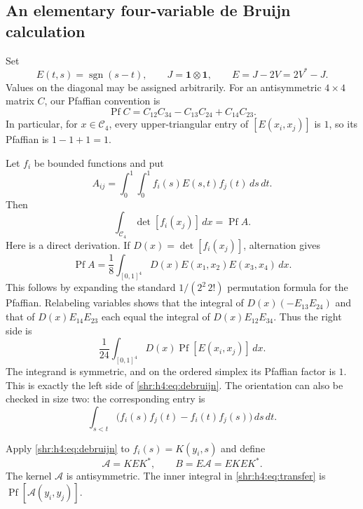 \documentclass[11pt,letterpaper]{article}
\numberwithin{equation}{section}
\theoremstyle{definition}
\newcommand{\1}{\mathbf 1}
\DeclareMathOperator{\sgn}{sgn}
\newcommand{\one}{\mathbf1}
\DeclareMathOperator{\Pf}{Pf}
\newcommand{\dd}{\,d}
\begin{document}
\subsection{An elementary four-variable de Bruijn calculation}
Set
\begin{equation}
 E(t,s)=\sgn(s-t),\qquad J=\one\otimes\one,
 \qquad E=J-2V=2V^*-J.
 \label{shr:h4:eq:E}
\end{equation}
Values on the diagonal may be assigned arbitrarily. For an antisymmetric
$4\times4$ matrix $C$, our Pfaffian convention is
\[
 \Pf C=C_{12}C_{34}-C_{13}C_{24}+C_{14}C_{23}.
\]
In particular, for $x\in\mathcal C_4$, every upper-triangular entry of
$[E(x_i,x_j)]$ is $1$, so its Pfaffian is $1-1+1=1$.

Let $f_i$ be bounded functions and put
\[
 A_{ij}=\int_0^1\int_0^1 f_i(s)E(s,t)f_j(t)\dd s\dd t.
\]
Then
\begin{equation}
 \int_{\mathcal C_4}\det[f_i(x_j)]\dd x=\Pf A.
 \label{shr:h4:eq:debruijn}
\end{equation}
Here is a direct derivation. If $D(x)=\det[f_i(x_j)]$, alternation gives
\[
 \Pf A=\frac18\int_{[0,1]^4}D(x)E(x_1,x_2)E(x_3,x_4)\dd x.
\]
This follows by expanding the standard $1/(2^2\,2!)$ permutation formula
for the Pfaffian. Relabeling variables shows that the integral of
$D(x)(-E_{13}E_{24})$ and that of $D(x)E_{14}E_{23}$ each equal the
integral of $D(x)E_{12}E_{34}$. Thus the right side is
\[
 \frac1{24}\int_{[0,1]^4}D(x)\Pf[E(x_i,x_j)]\dd x.
\]
The integrand is symmetric, and on the ordered simplex its Pfaffian factor
is $1$. This is exactly the left side of \eqref{shr:h4:eq:debruijn}. The
orientation can also be checked in size two: the corresponding entry is
\[
 \int_{s<t}\bigl(f_i(s)f_j(t)-f_i(t)f_j(s)\bigr)\dd s\dd t.
\]

Apply \eqref{shr:h4:eq:debruijn} to $f_i(s)=K(y_i,s)$ and define
\begin{equation}
 \mathcal A=KEK^*,\qquad B=E\mathcal A=EKEK^*.
 \label{shr:h4:eq:ABkernels}
\end{equation}
The kernel $\mathcal A$ is antisymmetric. The inner integral in
\eqref{shr:h4:eq:transfer} is $\Pf[\mathcal A(y_i,y_j)]$.
\end{document}
